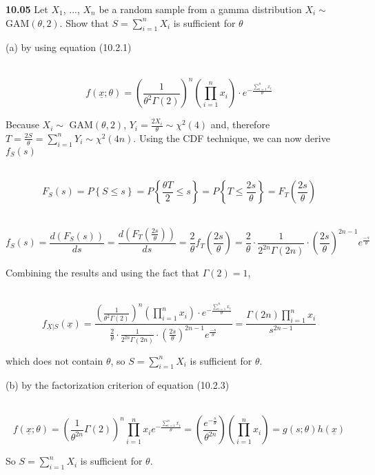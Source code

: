 \documentclass[12pt]{article}
\begin{document}
{ \bf 10.05 }Let $ X_{1} $, ..., $ X_{n} $ be a random sample from a gamma distribution $ X_{i} \sim $ GAM$ (\theta,2) $. Show that $ S=\sum_{i=1}^{n}X_{i} $ is sufficient for $ \theta $

(a) by using equation (10.2.1)

\ $$  f(\underline{x}; \theta )=  \left (\frac{1}{\theta^{2}\Gamma(2)} \right )^{n} (\prod_{i=1}^{n}x_{i}) \cdot e^{-\frac{\sum_{i=1}^{n}x_{i}}{\theta}}  $$

Because $ X_{i} \sim $ GAM$ (\theta,2) $, $Y_{i}=\frac{2X_{i}}{\theta} \sim \chi^{2}(4) $ and, therefore $ T=\frac{2S}{\theta}= \sum_{i=1}^{n}Y_{i} \sim \chi^{2}(4n) $.  Using the CDF technique, we can now derive $ f_{S}(s) $

\ $$ F_{S}(s)=P \left\{S \leq s \right\}= P \left\{ \frac{\theta T}{2} \leq s \right\}= P \left\{T \leq \frac{2s}{\theta} \right\}= F_{T}\left(\frac{2s}{\theta}\right) $$

\ $$ f_{S}(s)=\frac{d(F_{S}(s))}{ds}=\frac{d(F_{T}(\frac{2s}{\theta}))}{ds}=\frac{2}{\theta}f_{T}(\frac{2s}{\theta})=\frac{2}{\theta} \cdot \frac{1}{2^{2n}\Gamma(2n)} \cdot \left (\frac{2s}{\theta} \right )^{2n-1} e^{\frac{-s}{\theta}} $$

Combining the results and using the fact that $ \Gamma(2)=1 $,

\ $$ f_{\underline{X}|S}(\underline{x})= \frac {\left (\frac{1}{\theta^{2}\Gamma(2)} \right )^{n} (\prod_{i=1}^{n}x_{i}) \cdot e^{-\frac{\sum_{i=1}^{n}x_{i}}{\theta}}}{\frac{2}{\theta} \cdot \frac{1}{2^{2n}\Gamma(2n)} \cdot \left (\frac{2s}{\theta} \right )^{2n-1} e^{\frac{-s}{\theta}}}= \frac{\Gamma(2n) \prod_{i=1}^{n}x_{i}}{s^{2n-1}} $$

which does not contain $ \theta $, so $ S=\sum_{i=1}^{n}X_{i} $ is sufficient for $ \theta $.



(b) by the factorization criterion of equation (10.2.3)

\ $$  f(\underline{x}; \theta )=  \left ( \frac{1}{\theta^{2n}} \Gamma(2) \right )^{n}\prod_{i=1}^{n}x_{i}e^{-\frac{\sum_{i=1}^{n}x_{i}}{\theta}}= \left ( \frac{e^{-\frac{s}{\theta}}}{\theta^{2n}} \right) (\prod_{i=1}^{n}x_{i})= g(s;\theta) h( \underline{x}) $$

So $ S=\sum_{i=1}^{n}X_{i} $ is sufficient for $ \theta $.
\end{document}
